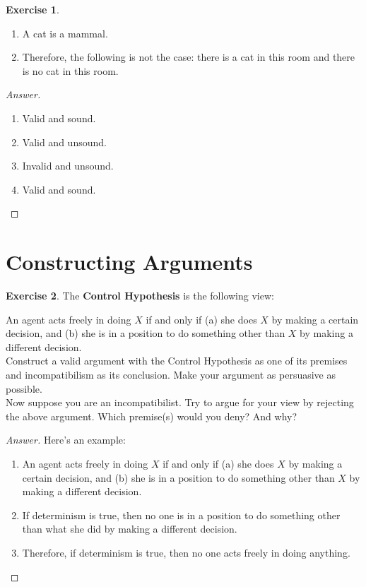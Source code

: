 \documentclass[11pt]{article}
\theoremstyle{definition}
\newtheorem{exer}{Exercise}
\begin{document}
\begin{exer}
\hfill
\begin{enumerate}
\item A cat is a mammal.
\item Therefore, the following is not the case: there is a cat in this room and there is no cat in this room. 
\end{enumerate}
\end{exer}

\begin{proof}[Answer]
\hfill
\begin{enumerate}
\item Valid and sound.
\item Valid and unsound.
\item Invalid and unsound.
\item Valid and sound.
\end{enumerate}

\end{proof}

\section{Constructing Arguments}

\begin{exer}
\hfill

\noindent
The \textbf{Control Hypothesis} is the following view:

An agent acts freely in doing $X$ if and only if (a) she does $X$ by making a certain decision, and (b) she is in a position to do something other than $X$ by making a different decision.  \\

\noindent
Construct a valid argument with the Control Hypothesis as one of its premises and incompatibilism as its conclusion. Make your argument as persuasive as possible. \\

\noindent
Now suppose you are an incompatibilist. Try to argue for your view by rejecting the above argument. Which premise(s) would you deny? And why?

\end{exer}

\begin{proof}[Answer]
Here's an example:
\begin{enumerate}
\item An agent acts freely in doing $X$ if and only if (a) she does $X$ by making a certain decision, and (b) she is in a position to do something other than $X$ by making a different decision.
\item If determinism is true, then no one is in a position to do something other than what she did by making a different decision.
\item Therefore, if determinism is true, then no one acts freely in doing anything.
\end{enumerate}

\end{proof}
\end{document}
